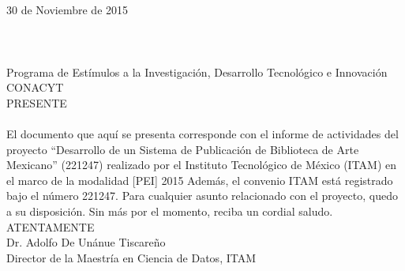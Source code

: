 \chapter*{\phantom{Declaración}}

\noindent \hfill 30 de Noviembre de 2015\\
\\
\\
\\
Programa de Estímulos a la Investigación, 
Desarrollo Tecnológico e Innovación\\
CONACYT\\
PRESENTE\\
\vspace{30pt}
\\
\newline
El documento que aquí se presenta corresponde con el informe de actividades del proyecto 
“Desarrollo de un Sistema de 
Publicación de Biblioteca de Arte Mexicano” 
(221247) realizado por el 
Instituto Tecnológico de México (ITAM) en el marco de la modalidad [PEI] 2015 
Además, el convenio ITAM está registrado bajo el número 221247.
Para cualquier asunto relacionado con el proyecto, quedo a su disposición.
Sin más por el momento, reciba un cordial saludo.\\
\newline
ATENTAMENTE\\

\vspace{70pt}
 Dr. Adolfo De Unánue Tiscareño\\
 Director de la Maestría en Ciencia de Datos, ITAM 




\clearpage